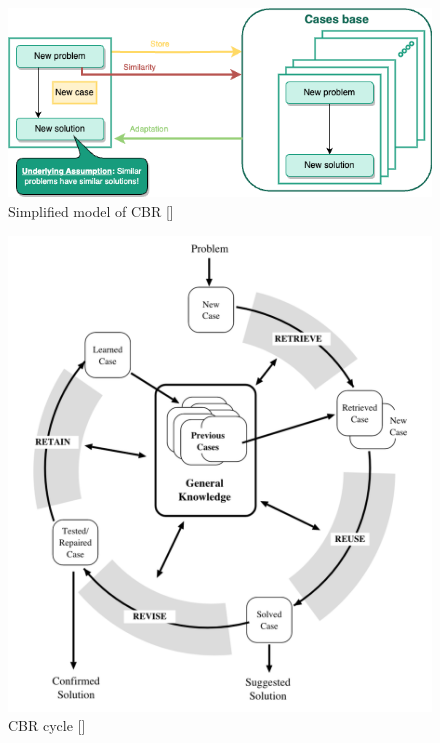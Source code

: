     \begin{figure}[h]
    \centering
    \includegraphics[width=\textwidth]{images/Concept-simplified-cbr-Simplified CBR princip.drawio.png}
    \caption{\label{fig:simple-cbr}  Simplified model of CBR []}
    \end{figure}
    
    \begin{figure}[h]
    \centering
    \includegraphics[scale=0.6]{images/Concept-cbr-cycle.png}
    \caption{\label{fig:cbr-cycle}  CBR cycle []}
    \end{figure}
    

